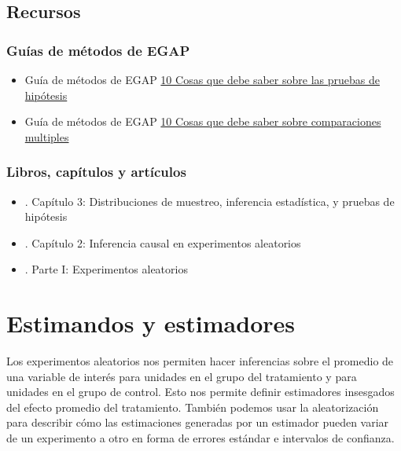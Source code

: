 \documentclass[12pt,spanish,]{book}
\begin{document}
\hypertarget{recursos-3}{%
\section{Recursos}\label{recursos-3}}

\hypertarget{guuxedas-de-muxe9todos-de-egap-2}{%
\subsection{Guías de métodos de EGAP}\label{guuxedas-de-muxe9todos-de-egap-2}}

\begin{itemize}
\item
  Guía de métodos de EGAP \href{https://egap.org/resource/10-things-to-know-about-hypothesis-testing/}{10 Cosas que debe saber sobre las pruebas de hipótesis}
\item
  Guía de métodos de EGAP \href{https://egap.org/resource/10-things-to-know-about-multiple-comparisons/}{10 Cosas que debe saber sobre comparaciones multiples}
\end{itemize}

\hypertarget{libros-capuxedtulos-y-artuxedculos-2}{%
\subsection{Libros, capítulos y artículos}\label{libros-capuxedtulos-y-artuxedculos-2}}

\begin{itemize}
\item
  \autocite{gerber_field_2012}. Capítulo 3: Distribuciones de muestreo, inferencia estadística, y pruebas de hipótesis
\item
  \autocite{rosenbaum2010design}. Capítulo 2: Inferencia causal en experimentos aleatorios
\item
  \autocite{rosenbaum2017observation}. Parte I: Experimentos aleatorios
\end{itemize}

\hypertarget{estimandos-y-estimadores}{%
\chapter{Estimandos y estimadores}\label{estimandos-y-estimadores}}

Los experimentos aleatorios nos permiten hacer inferencias sobre el promedio de una variable de interés para unidades en el grupo del tratamiento y para unidades en el grupo de control. Esto nos permite definir estimadores insesgados del efecto promedio del tratamiento. También podemos usar la aleatorización para describir cómo las estimaciones generadas por un estimador pueden variar de un experimento a otro en forma de errores estándar e intervalos de confianza.
\end{document}
